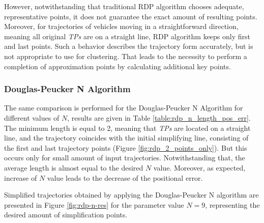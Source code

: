 However, notwithstanding that traditional RDP algorithm chooses adequate, representative points, it does not guarantee the exact amount of resulting points. Moreover, for trajectories of vehicles moving in a straightforward direction, meaning all original \textit{TPs} are on a straight line, RDP algorithm keeps only first and last points. Such a behavior describes the trajectory form accurately, but is not appropriate to use for clustering. That leads to the necessity to perform a completion of approximation points by calculating additional key points.

\subsubsection{Douglas-Peucker N Algorithm}

The same comparison is performed for the Douglas-Peucker N Algorithm for different values of $N$, results are given in Table \ref{table:rdp_n_length_pos_err}. The minimum length is equal to 2, meaning that \textit{TPs} are located on a straight line, and the trajectory coincides with the initial simplifying line, consisting of the first and last trajectory points (Figure \ref{fig:rdp_2_points_only}). But this occurs only for small amount of input trajectories. Notwithstanding that, the average length is almost equal to the desired $N$ value. Moreover, as expected, increase of $N$ value leads to the decrease of the positional error. 

Simplified trajectories obtained by applying the Douglas-Peucker N algorithm are presented in Figure \ref{fig:rdp-n-res} for the parameter value $N = 9$, representing the desired amount of simplification points.

